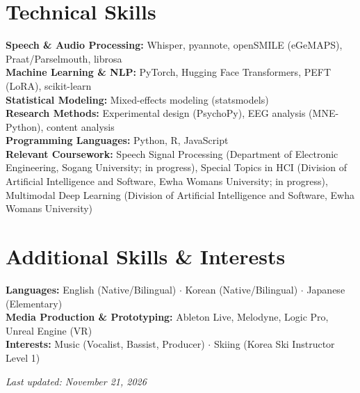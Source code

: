 \documentclass[11pt,a4paper]{article}
\begin{document}
\section{Technical Skills}

\textbf{Speech \& Audio Processing:} Whisper, pyannote, openSMILE (eGeMAPS), Praat/Parselmouth, librosa\\
\textbf{Machine Learning \& NLP:} PyTorch, Hugging Face Transformers, PEFT (LoRA), scikit-learn\\
\textbf{Statistical Modeling:} Mixed-effects modeling (statsmodels)\\
\textbf{Research Methods:} Experimental design (PsychoPy), EEG analysis (MNE-Python), content analysis\\
\textbf{Programming Languages:} Python, R, JavaScript\\
\textbf{Relevant Coursework:} Speech Signal Processing (Department of Electronic Engineering, Sogang University; in progress), Special Topics in HCI (Division of Artificial Intelligence and Software, Ewha Womans University; in progress), Multimodal Deep Learning (Division of Artificial Intelligence and Software, Ewha Womans University)

\section{Additional Skills \& Interests}

\textbf{Languages:} English (Native/Bilingual) $\cdot$ Korean (Native/Bilingual) $\cdot$ Japanese (Elementary)\\
\textbf{Media Production \& Prototyping:} Ableton Live, Melodyne, Logic Pro, Unreal Engine (VR)\\
\textbf{Interests:} Music (Vocalist, Bassist, Producer) $\cdot$ Skiing (Korea Ski Instructor Level 1)

{\centering\small\textit{Last updated: November 21, 2026}\par}
\end{document}
